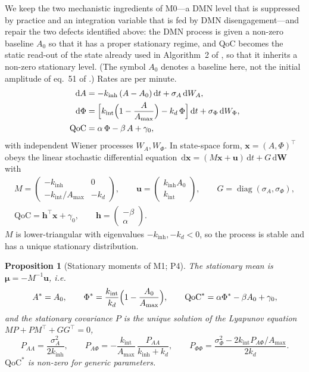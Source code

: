 \documentclass[12pt,a4paper]{article}
\theoremstyle{plain}
\newtheorem{proposition}[theorem]{Proposition}
\theoremstyle{definition}
\theoremstyle{remark}
\newcommand{\QoC}{\mathrm{QoC}}
\newcommand{\kinh}{k_{\mathrm{inh}}}
\newcommand{\kint}{k_{\mathrm{int}}}
\newcommand{\kd}{k_{d}}
\newcommand{\Amax}{A_{\max}}
\newcommand{\sA}{\sigma_{A}}
\newcommand{\sPhi}{\sigma_{\Phi}}
\renewcommand{\dd}{\,\mathrm{d}}   %
\newcommand{\diag}{\operatorname{diag}}
\newcommand{\muv}{\boldsymbol{\mu}}
\newcommand{\xv}{\mathbf{x}}
\newcommand{\hv}{\mathbf{h}}
\newcommand{\uv}{\mathbf{u}}
\begin{document}
We keep the two mechanistic ingredients of M0---a DMN level that is suppressed by practice and an integration variable that is fed by DMN disengagement---and repair the two defects identified above: the DMN process is given a non-zero baseline $A_0$ so that it has a proper stationary regime, and QoC becomes the static read-out of the state already used in Algorithm~2 of \citet{BQI}, so that it inherits a non-zero stationary level. (The symbol $A_0$ denotes a baseline here, not the initial amplitude of eq.~51 of \citealp{BQI}.) Rates are per minute.
\begin{align}
  \dd A    &= -\kinh\,(A-A_0)\dd t + \sA\dd W_A, \label{eq:m1A}\\
  \dd \Phi &= \Bigl[\kint\Bigl(1-\frac{A}{\Amax}\Bigr)-\kd\,\Phi\Bigr]\dd t + \sPhi\dd W_\Phi, \label{eq:m1Phi}\\
  \QoC     &= \alpha\,\Phi-\beta\,A+\gamma_0, \label{eq:m1Q}
\end{align}
with independent Wiener processes $W_A,W_\Phi$. In state-space form, $\xv=(A,\Phi)^\top$ obeys the linear stochastic differential equation $\dd\xv=(M\xv+\uv)\dd t+G\dd\mathbf W$ with
\begin{equation}
\begin{gathered}
  M=\begin{pmatrix}-\kinh & 0\\ -\kint/\Amax & -\kd\end{pmatrix},\qquad
  \uv=\begin{pmatrix}\kinh A_0\\ \kint\end{pmatrix},\qquad
  G=\diag(\sA,\sPhi),\\
  \QoC=\hv^\top\xv+\gamma_0,\qquad \hv=\begin{pmatrix}-\beta\\ \alpha\end{pmatrix}.
\end{gathered}
  \label{eq:ss}
\end{equation}
$M$ is lower-triangular with eigenvalues $-\kinh,-\kd<0$, so the process is stable and has a unique stationary distribution.

\begin{proposition}[Stationary moments of M1; P4]
\label{prop:p4}
The stationary mean is $\muv=-M^{-1}\uv$, i.e.
\begin{equation}
  A^*=A_0,\qquad \Phi^*=\frac{\kint}{\kd}\Bigl(1-\frac{A_0}{\Amax}\Bigr),\qquad
  \QoC^*=\alpha\Phi^*-\beta A_0+\gamma_0,
  \label{eq:m1ss}
\end{equation}
and the stationary covariance $P$ is the unique solution of the Lyapunov equation $MP+PM^\top+GG^\top=0$,
\begin{equation}
  P_{AA}=\frac{\sA^2}{2\kinh},\qquad
  P_{A\Phi}=-\frac{\kint}{\Amax}\,\frac{P_{AA}}{\kinh+\kd},\qquad
  P_{\Phi\Phi}=\frac{\sPhi^2-2\kint P_{A\Phi}/\Amax}{2\kd}.
  \label{eq:P}
\end{equation}
$\QoC^*$ is non-zero for generic parameters.
\end{proposition}
\end{document}
